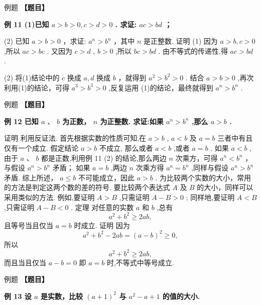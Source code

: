 \documentclass[a4paper,10pt,oneside,fontset=none]{ctexbook}
\renewcommand{\geq}{\geqslant}
\renewcommand{\leq}{\leqslant}
\newcounter{example}[chapter]
\newenvironment{example}[1][]{\begin{exBox}{例题}{#1}}{\end{exBox}}
\numberwithin{equation}{chapter}
\begin{document}
\begin{example}
\textbf{【题目】}\par\vspace{0.3em}
\textbf{例 11 (1)已知 $a > b > 0, c > d > 0$ . 求证: ${ac} > {bd}$ ；}\par\vspace{0.3em}
\par
(2) 已知 $a > b > 0$ ，求证: ${a}^{n} > {b}^{n}$ ，其中 $n$ 是正整数.
证明 (1) 因为 $a > b, c > 0$ ,所以 ${ac} > {bc}$ . 又因为 $c > d$ , $b > 0$ ,所以 ${bc} > {bd}$ . 由不等式的传递性,得 ${ac} > {bd}$ .
\par
(2) 将(1)结论中的 $c$ 换成 $a, d$ 换成 $b$ ，就得到 ${a}^{2} > {b}^{2} > 0$ . 结合 $a > b > 0$ ,再次利用(1)的结论，可得 ${a}^{3} > {b}^{3} > 0$ ,反复运用 (1)的结论，最终就得到 ${a}^{n} > {b}^{n}$ .
\end{example}

\begin{example}
\textbf{【题目】}\par\vspace{0.3em}
\textbf{例 12 已知 $a\text{ 、 }b$ 为正数， $n$ 为正整数. 求证:如果 ${a}^{n} > {b}^{n}$ ,那么 $a > b$ .}\par\vspace{0.3em}
证明 利用反证法. 首先根据实数的性质可知,在 $a > b$ , $a < b$ 及 $a = b$ 三者中有且仅有一个成立. 假定结论 $a > b$ 不成立, 那么或者 $a < b$ ,或者 $a = b$ .
如果 $a < b$ ,由于 $a\text{ 、 }b$ 都是正数,利用例 11 (2) 的结论,那么两边 $n$ 次乘方，可得 ${a}^{n} < {b}^{n}$ ，与假设 ${a}^{n} > {b}^{n}$ 矛盾；
如果 $a = b$ ,两边 $n$ 次乘方得 ${a}^{n} = {b}^{n}$ ,同样与假设 ${a}^{n} > {b}^{n}$ 矛盾.
综上所述， $a \leq  b$ 不可能成立，因此 $a > b$ .
为比较两个实数的大小，常用的方法是判定这两个数的差的符号. 要比较两个表达式 $A$ 及 $B$ 的大小，同样可以采用类似的方法. 例如,要证明 $A > B$ ,只需证明 $A - B > 0$ ; 同样地,要证明 $A < B$ ,只需证明 $A - B < 0$ .
定理 对任意的实数 $a$ 和 $b$ ,总有
$$
{a}^{2} + {b}^{2} \geq  {2ab},
$$
且等号当且仅当 $a = b$ 时成立.
证明 因为
$$
{a}^{2} + {b}^{2} - {2ab} = {\left( a - b\right) }^{2} \geq  0,
$$
所以
$$
{a}^{2} + {b}^{2} \geq  {2ab},
$$
而且当且仅当 $a - b = 0$ 即 $a = b$ 时,不等式中等号成立.
\end{example}

\begin{example}
\textbf{【题目】}\par\vspace{0.3em}
\textbf{例 13 设 $a$ 是实数，比较 ${\left( a + 1\right) }^{2}$ 与 ${a}^{2} - a + 1$ 的值的大小.}\par\vspace{0.3em}
\end{example}
\end{document}
